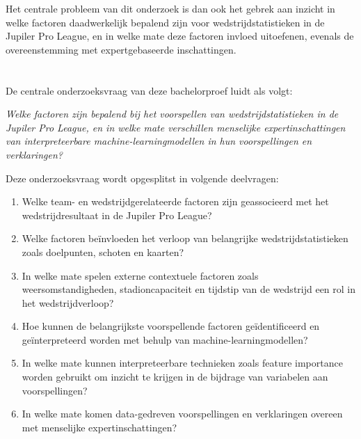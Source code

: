 \vspace{5pt}

Het centrale probleem van dit onderzoek is dan ook het gebrek aan inzicht in welke factoren daadwerkelijk bepalend zijn voor wedstrijdstatistieken in de Jupiler Pro League, 
en in welke mate deze factoren invloed uitoefenen, evenals de overeenstemming met expertgebaseerde inschattingen.

\section{}%
\label{sec:onderzoeksvraag}

De centrale onderzoeksvraag van deze bachelorproef luidt als volgt:

\vspace{5pt}

\textit{Welke factoren zijn bepalend bij het voorspellen van wedstrijdstatistieken in de Jupiler Pro League, 
en in welke mate verschillen menselijke expertinschattingen van interpreteerbare machine-learningmodellen in hun voorspellingen en verklaringen?}

\vspace{5pt}

Deze onderzoeksvraag wordt opgesplitst in volgende deelvragen:

\begin{enumerate}

    \item Welke team- en wedstrijdgerelateerde factoren zijn geassocieerd met het wedstrijdresultaat in de Jupiler Pro League?

    \item Welke factoren beïnvloeden het verloop van belangrijke wedstrijdstatistieken zoals doelpunten, schoten en kaarten?

    \item In welke mate spelen externe contextuele factoren zoals weersomstandigheden, stadioncapaciteit en tijdstip van de wedstrijd een rol in het wedstrijdverloop?

    \item Hoe kunnen de belangrijkste voorspellende factoren geïdentificeerd en geïnterpreteerd worden met behulp van machine-learningmodellen?

    \item In welke mate kunnen interpreteerbare technieken zoals feature importance worden gebruikt om inzicht te krijgen in de bijdrage van variabelen aan voorspellingen?

    \item In welke mate komen data-gedreven voorspellingen en verklaringen overeen met menselijke expertinschattingen?

\end{enumerate}

